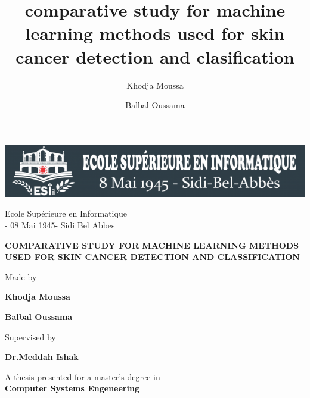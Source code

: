 \documentclass[12pt,a4paper]{article}
\title{comparative study for machine learning methods used for skin cancer detection and clasification}
\author{
	Khodja Moussa
	\and
	Balbal Oussama
}
\date{}
\begin{document}
	\begin{titlepage}
		\begin{center}	
			\Large
			
			\includegraphics[]{esi-logo.png}
			
			Ecole Supérieure en Informatique\\
			- 08 Mai 1945- Sidi Bel Abbes
			
			\hrulefill
			
			\vspace{0.5cm}
			\textbf{COMPARATIVE STUDY FOR MACHINE LEARNING METHODS USED FOR SKIN CANCER DETECTION AND CLASSIFICATION}
			
			\LARGE
			
			\vspace{1.5cm}
			Made by
			\vspace{0.5cm}
			
			\textbf{Khodja Moussa}
			
			\textbf{Balbal Oussama}
			
			\vspace{1.5cm}
			Supervised by
			\vspace{0.5cm}
			
			\textbf{Dr.Meddah Ishak}			
			
			\vfill
			A thesis presented for a master's degree in\\
			\textbf{Computer Systems Engeneering}
			\vspace{0.8cm}
		\end{center}
	\end{titlepage}
\end{document}
